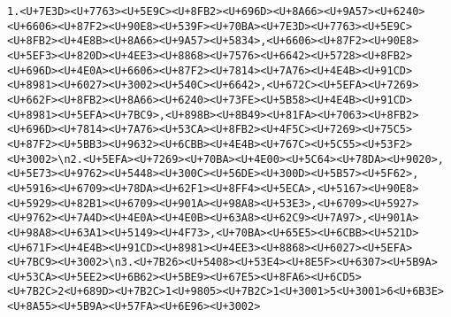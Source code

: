 \documentclass[
]{article}
\begin{document}
\begin{verbatim}
1.<U+7E3D><U+7763><U+5E9C><U+8FB2><U+696D><U+8A66><U+9A57><U+6240><U+6606><U+87F2><U+90E8><U+539F><U+70BA><U+7E3D><U+7763><U+5E9C><U+8FB2><U+4E8B><U+8A66><U+9A57><U+5834>,<U+6606><U+87F2><U+90E8><U+5EF3><U+820D><U+4EE3><U+8868><U+7576><U+6642><U+5728><U+8FB2><U+696D><U+4E0A><U+6606><U+87F2><U+7814><U+7A76><U+4E4B><U+91CD><U+8981><U+6027><U+3002><U+540C><U+6642>,<U+672C><U+5EFA><U+7269><U+662F><U+8FB2><U+8A66><U+6240><U+73FE><U+5B58><U+4E4B><U+91CD><U+8981><U+5EFA><U+7BC9>,<U+898B><U+8B49><U+81FA><U+7063><U+8FB2><U+696D><U+7814><U+7A76><U+53CA><U+8FB2><U+4F5C><U+7269><U+75C5><U+87F2><U+5BB3><U+9632><U+6CBB><U+4E4B><U+767C><U+5C55><U+53F2><U+3002>\n2.<U+5EFA><U+7269><U+70BA><U+4E00><U+5C64><U+78DA><U+9020>,<U+5E73><U+9762><U+5448><U+300C><U+56DE><U+300D><U+5B57><U+5F62>,<U+5916><U+6709><U+78DA><U+62F1><U+8FF4><U+5ECA>,<U+5167><U+90E8><U+5929><U+82B1><U+6709><U+901A><U+98A8><U+53E3>,<U+6709><U+5927><U+9762><U+7A4D><U+4E0A><U+4E0B><U+63A8><U+62C9><U+7A97>,<U+901A><U+98A8><U+63A1><U+5149><U+4F73>,<U+70BA><U+65E5><U+6CBB><U+521D><U+671F><U+4E4B><U+91CD><U+8981><U+4EE3><U+8868><U+6027><U+5EFA><U+7BC9><U+3002>\n3.<U+7B26><U+5408><U+53E4><U+8E5F><U+6307><U+5B9A><U+53CA><U+5EE2><U+6B62><U+5BE9><U+67E5><U+8FA6><U+6CD5><U+7B2C>2<U+689D><U+7B2C>1<U+9805><U+7B2C>1<U+3001>5<U+3001>6<U+6B3E><U+8A55><U+5B9A><U+57FA><U+6E96><U+3002>

\end{verbatim}
\end{document}
